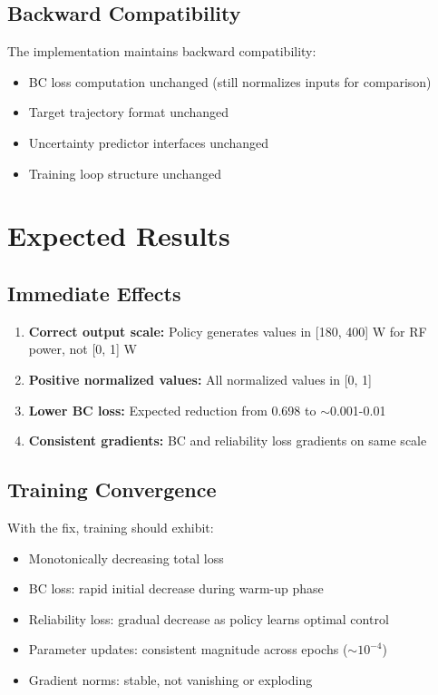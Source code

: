 \documentclass[11pt,a4paper]{article}
\begin{document}
\subsection{Backward Compatibility}

The implementation maintains backward compatibility:
\begin{itemize}
    \item BC loss computation unchanged (still normalizes inputs for comparison)
    \item Target trajectory format unchanged
    \item Uncertainty predictor interfaces unchanged
    \item Training loop structure unchanged
\end{itemize}

\section{Expected Results}

\subsection{Immediate Effects}

\begin{enumerate}
    \item \textbf{Correct output scale:} Policy generates values in [180, 400] W for RF power, not [0, 1] W
    \item \textbf{Positive normalized values:} All normalized values in [0, 1]
    \item \textbf{Lower BC loss:} Expected reduction from 0.698 to $\sim$0.001-0.01
    \item \textbf{Consistent gradients:} BC and reliability loss gradients on same scale
\end{enumerate}

\subsection{Training Convergence}

With the fix, training should exhibit:
\begin{itemize}
    \item Monotonically decreasing total loss
    \item BC loss: rapid initial decrease during warm-up phase
    \item Reliability loss: gradual decrease as policy learns optimal control
    \item Parameter updates: consistent magnitude across epochs ($\sim 10^{-4}$)
    \item Gradient norms: stable, not vanishing or exploding
\end{itemize}
\end{document}
